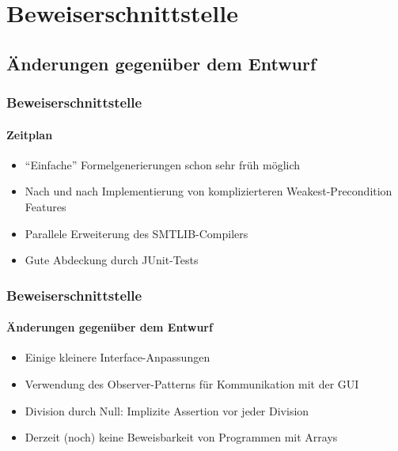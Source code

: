 \section{Beweiserschnittstelle}

\subsection{Änderungen gegenüber dem Entwurf}
\begin{frame}
\frametitle{Beweiserschnittstelle}
\framesubtitle{Zeitplan}
\begin{itemize}
	\item<+-> ``Einfache'' Formelgenerierungen schon sehr früh möglich
	\item<+-> Nach und nach Implementierung von komplizierteren Weakest-Precondition Features
	\item<+-> Parallele Erweiterung des SMTLIB-Compilers
	\item<+-> Gute Abdeckung durch JUnit-Tests
\end{itemize}
\end{frame}

\begin{frame}
\frametitle{Beweiserschnittstelle}
\framesubtitle{Änderungen gegenüber dem Entwurf}
\begin{itemize}
	\item<+-> Einige kleinere Interface-Anpassungen
	\item<+-> Verwendung des Observer-Patterns für Kommunikation mit der GUI
	\item<+-> Division durch Null: Implizite Assertion vor jeder Division
	\item<+-> Derzeit (noch) keine Beweisbarkeit von Programmen mit Arrays
\end{itemize}
\end{frame}

